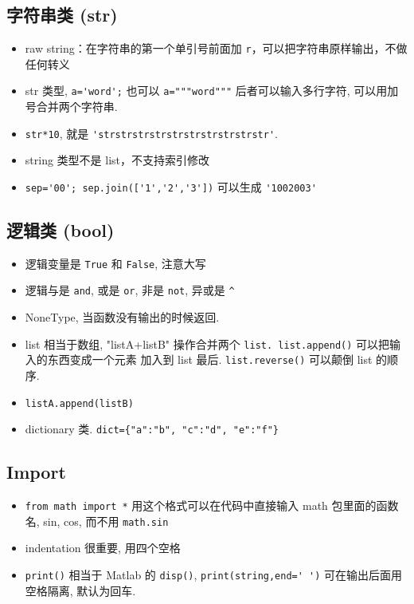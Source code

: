 \subsection{字符串类 (str)}
\begin{itemize}
\item raw string：在字符串的第一个单引号前面加 \verb`r`，可以把字符串原样输出，不做任何转义
\item str 类型, \verb`a='word';` 也可以 \verb`a="""word"""` 后者可以输入多行字符, 可以用加号合并两个字符串.
\item \verb`str*10`, 就是 \verb`'strstrstrstrstrstrstrstrstrstr'`.
\item string 类型不是 list，不支持索引修改
\item \verb`sep='00'; sep.join(['1','2','3'])` 可以生成 \verb`'1002003'`
\end{itemize}

\subsection{逻辑类 (bool)}
\begin{itemize}
\item 逻辑变量是 \verb`True` 和 \verb`False`, 注意大写
\item 逻辑与是 \verb`and`, 或是 \verb`or`, 非是 \verb`not`, 异或是 \verb`^`
\item NoneType, 当函数没有输出的时候返回.
\item list 相当于数组, "listA+listB" 操作合并两个 \verb`list. list.append()` 可以把输入的东西变成一个元素
    加入到 list 最后.  \verb`list.reverse()` 可以颠倒 list 的顺序.
\item \verb`listA.append(listB)`
\item dictionary 类.  \verb`dict={"a":"b", "c":"d", "e":"f"}`
\end{itemize}

\subsection{Import}
\begin{itemize}
\item \verb`from math import *` 用这个格式可以在代码中直接输入 math 包里面的函数名, sin, cos, 而不用 \verb`math.sin`
\item indentation 很重要, 用四个空格
\item \verb`print()` 相当于 Matlab 的 \verb`disp()`, \verb`print(string,end=' ')` 可在输出后面用空格隔离, 默认为回车. 
\end{itemize}

